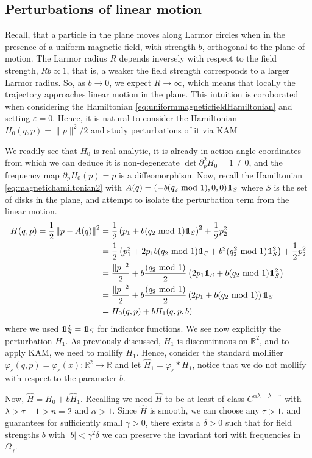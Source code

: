 \subsection{Perturbations of linear motion}

Recall, that a particle in the plane moves along Larmor circles when in the presence of a uniform magnetic field, with strength $b$, orthogonal to the plane of motion. The Larmor radius $R$ depends inversely with respect to the field strength, $Rb\varpropto 1$, that is, a weaker the field strength corresponds to a larger Larmor radius. So, as $b\to 0$, we expect $R\to\infty$, which means that locally the trajectory approaches linear motion in the plane. This intuition is coroborated when considering the Hamiltonian \eqref{eq:uniformmagneticfieldHamiltonian} and setting $\varepsilon=0$. Hence, it is natural to consider the Hamiltonian $H_0(q,p)=\|p\|^2/2$ and study perturbations of it via KAM

We readily see that $H_0$ is real analytic, it is already in action-angle coordinates from which we can deduce it is non-degenerate $\det \partial_p^2 H_0=1\neq0$, and the frequency map $\partial_p H_0(p) = p$ is a diffeomorphism. Now, recall the Hamiltonian \eqref{eq:magnetichamiltonian2} with $A(q) = (-b(q_2\text{ mod }1),0,0)\one_S$ where $S$ is the set of disks in the plane, and attempt to isolate the perturbation term from the linear motion.
\begin{align*}
H(q,p) = \frac{1}{2}\left\|p-A(q)\right\|^2
  &= \frac{1}{2}\left(p_1+b(q_2\text{ mod }1)\one_S\right)^2 + \frac{1}{2}p_2^2\\
  &= \frac{1}{2}\left(p_1^2+2p_1b(q_2\text{ mod }1)\one_S+b^2(q_2^2\text{ mod }1)\one_S^2\right) + \frac{1}{2}p_2^2\\
  &= \frac{\|p\|^2}{2} + b\frac{(q_2\text{ mod }1)}{2}\left(2p_1\one_S+b(q_2\text{ mod }1)\one_S^2\right)\\
  &= \frac{\|p\|^2}{2} + b\frac{(q_2\text{ mod }1)}{2}\left(2p_1+b(q_2\text{ mod }1)\right)\one_S\\
  &= H_0(q,p) + bH_1(q,p,b)
\end{align*}
where we used $\one_S^2=\one_S$ for indicator functions. We see now explicitly the perturbation $H_1$. As previously discussed, $H_1$ is discontinuous on $\mathbb R^2$, and to apply KAM, we need to mollify $H_1$. Hence, consider the standard mollifier $\varphi_\varepsilon(q,p)=\varphi_\varepsilon(x):\mathbb R^2\to\mathbb R$ and let $\hat H_1 = \varphi_\varepsilon*H_1$, notice that we do not mollify with respect to the parameter $b$.

Now, $\hat H=H_0+b \hat H_1$. Recalling  we need $\hat H$ to be at least of class $C^{\alpha\lambda+\lambda+\tau}$ with $\lambda > \tau +1 >n=2$ and $\alpha>1$. Since $\hat H$ is smooth, we can choose any $\tau>1$, and  guarantees for sufficiently small $\gamma>0$, there exists a $\delta>0$ such that for field strengths $b$ with $|b|<\gamma^2\delta$ we can preserve the invariant tori with frequencies in $\Omega_\gamma$.